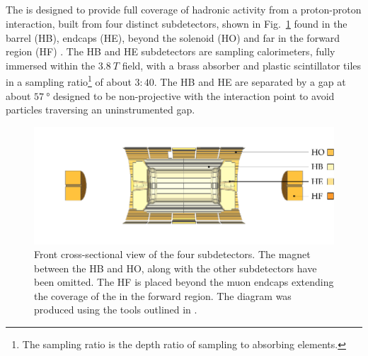 \subsection{\HCAL}

The \HCAL is designed to provide full coverage of hadronic activity from a
proton-proton interaction, built from four distinct subdetectors, shown in
Fig.~\ref{fig:cms-hcal} found in the barrel (HB), endcaps (HE), beyond the
solenoid (HO) and far in the forward region (HF) \cite{Mans:1481837}. The HB
and HE subdetectors are sampling calorimeters, fully immersed within the
${\SI{3.8}{T}}$ field, with a brass absorber and plastic scintillator tiles in
a sampling ratio\footnote{The sampling ratio is the depth ratio of sampling to
absorbing elements.} of about $3:40$. The HB and HE are separated by a gap at
about $\SI{57}{\degree}$ designed to be non-projective with the interaction
point to avoid particles traversing an uninstrumented gap.

\begin{figure}[htb]
    \centering
    \includegraphics{diagrams/tikz/cms/annotated/cms_hcal.pdf}
    \caption[Front cross-section view of the four HCAL subdetectors]{
        Front cross-sectional view of the four \HCAL subdetectors. The magnet
        between the HB and HO, along with the other subdetectors have been
        omitted. The HF is placed beyond the muon endcaps extending the
        coverage of the \HCAL in the forward region. The diagram was produced
        using the tools outlined in \cite{Sakuma:2013jqa}.
    }
    \label{fig:cms-hcal}
\end{figure}

